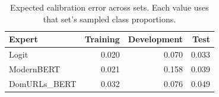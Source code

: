 \begin{table}[!t]
\caption{Expected calibration error across sets. Each value uses that set's sampled class proportions.}
\label{tab:calibration}
\centering\small
\begin{tabular}{@{}lrrr@{}}
\toprule
Expert & Training & Development & Test \\
\midrule
Logit & 0.020 & 0.070 & 0.033 \\
ModernBERT & 0.021 & 0.158 & 0.039 \\
DomURLs\_BERT & 0.032 & 0.076 & 0.049 \\
\bottomrule
\end{tabular}
\end{table}
